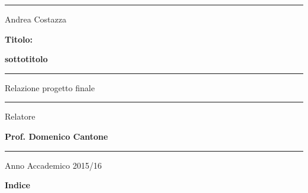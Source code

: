 \documentclass[a4paper,11pt]{article}
\begin{document}
\begin{center}
	\hrule
\end{center}

\vspace*{50pt}

\begin{center}
	\LARGE Andrea Costazza
\end{center}

\vspace*{30pt}

\begin{center}
	\LARGE \textbf{Titolo:}

	\LARGE \textbf{sottotitolo}
\end{center}

\vspace*{80pt}

\noindent\hfil\rule{0.2\textwidth}{.4pt}\hfil

\begin{center}
	\Large Relazione progetto finale
\end{center}

\noindent\hfil\rule{0.2\textwidth}{.4pt}\hfil

\vspace*{180pt}

\begin{flushright}
	\Large Relatore

	\Large \textbf {Prof. Domenico Cantone}
\end{flushright}

\bigskip
\bigskip

\hrule

\begin{center}
	\Large Anno Accademico 2015/16
\end{center}

\newpage
\null
\thispagestyle{empty}

\newpage

\LARGE{\textbf{Indice}}
\bigskip
  
\end{document}
